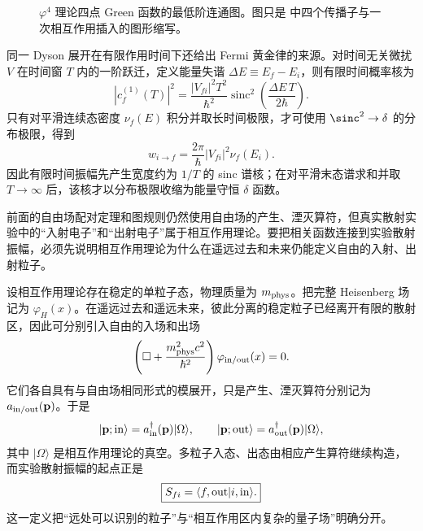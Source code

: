 \begin{figure}[htbp]
 \centering
 \caption{$\varphi^4$ 理论四点 Green 函数的最低阶连通图。图只是 中四个传播子与一次相互作用插入的图形缩写。}
 \label{fig:phi4-first-diagram-r3}
\end{figure}

同一 Dyson 展开在有限作用时间下还给出 Fermi 黄金律的来源。对时间无关微扰 $V$ 在时间窗 $T$ 内的一阶跃迁，定义能量失谐 $\Delta E\equiv E_f-E_i$，则有限时间概率核为
\begin{equation}
 \boxed{
 |c_f^{(1)}(T)|^2
 =\frac{|V_{fi}|^2T^2}{\hbar^2}
 \operatorname{sinc}^2\!\left(\frac{\Delta E\,T}{2\hbar}\right).}
 \label{eq:golden-sinc-r3}
\end{equation}
只有对平滑连续态密度 $\nu_f(E)$ 积分并取长时间极限，才可使用 $\sinc^2\to\delta$ 的分布极限，得到
\begin{equation}
 \boxed{
 w_{i\to f}
 =\frac{2\pi}{\hbar}|V_{fi}|^2\nu_f(E_i).}
 \label{eq:fermi-golden-r3}
\end{equation}
因此有限时间振幅先产生宽度约为 $1/T$ 的 sinc 谱核；在对平滑末态谱求和并取 $T\to\infty$ 后，该核才以分布极限收缩为能量守恒 $\delta$ 函数。

前面的自由场配对定理和图规则仍然使用自由场的产生、湮灭算符，但真实散射实验中的“入射电子”和“出射电子”属于相互作用理论。要把相关函数连接到实验散射振幅，必须先说明相互作用理论为什么在遥远过去和未来仍能定义自由的入射、出射粒子。

设相互作用理论存在稳定的单粒子态，物理质量为 $m_{\rm phys}$。把完整 Heisenberg 场记为 $\varphi_H(x)$。在遥远过去和遥远未来，彼此分离的稳定粒子已经离开有限的散射区，因此可分别引入自由的入场和出场
\begin{equation}
 \left(\Box+\frac{m_{\rm phys}^2c^2}{\hbar^2}\right)
 \varphi_{\rm in/out}(x)=0.
 \label{eq:asymptotic-free-field-dp48}
\end{equation}
它们各自具有与自由场相同形式的模展开，只是产生、湮灭算符分别记为 $a_{\rm in/out}(\mathbf p)$。于是
\begin{equation*}
 |\mathbf p;{\rm in}\rangle
 =a_{\rm in}^\dagger(\mathbf p)|\Omega\rangle,
 \qquad
 |\mathbf p;{\rm out}\rangle
 =a_{\rm out}^\dagger(\mathbf p)|\Omega\rangle,
\end{equation*}
其中 $|\Omega\rangle$ 是相互作用理论的真空。多粒子入态、出态由相应产生算符继续构造，而实验散射振幅的起点正是
\begin{equation}
 \boxed{S_{fi}=\langle f,{\rm out}|i,{\rm in}\rangle.}
 \label{eq:in-out-smatrix-dp48}
\end{equation}
这一定义把“远处可以识别的粒子”与“相互作用区内复杂的量子场”明确分开。

